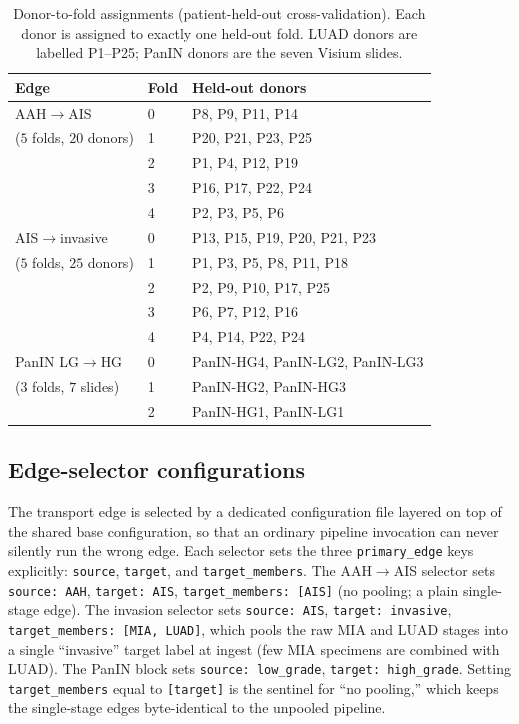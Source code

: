 \begin{table}[htbp]
  \centering
  \caption[Patient-fold assignments]{Donor-to-fold assignments (patient-held-out cross-validation).
  Each donor is assigned to exactly one held-out fold. LUAD donors are labelled P1--P25; PanIN
  donors are the seven Visium slides.}
  \label{tab:app-c-folds}
  \footnotesize
  \begin{tabular}{@{}llp{}@{}}
    \toprule
    Edge & Fold & Held-out donors \\
    \midrule
    AAH$\rightarrow$AIS      & 0 & P8, P9, P11, P14 \\
    ($5$ folds, $20$ donors) & 1 & P20, P21, P23, P25 \\
                             & 2 & P1, P4, P12, P19 \\
                             & 3 & P16, P17, P22, P24 \\
                             & 4 & P2, P3, P5, P6 \\
    \midrule
    AIS$\rightarrow$invasive & 0 & P13, P15, P19, P20, P21, P23 \\
    ($5$ folds, $25$ donors) & 1 & P1, P3, P5, P8, P11, P18 \\
                             & 2 & P2, P9, P10, P17, P25 \\
                             & 3 & P6, P7, P12, P16 \\
                             & 4 & P4, P14, P22, P24 \\
    \midrule
    PanIN LG$\rightarrow$HG  & 0 & PanIN-HG4, PanIN-LG2, PanIN-LG3 \\
    ($3$ folds, $7$ slides)  & 1 & PanIN-HG2, PanIN-HG3 \\
                             & 2 & PanIN-HG1, PanIN-LG1 \\
    \bottomrule
  \end{tabular}
\end{table}

\subsection{Edge-selector configurations}\label{sec:app-c-edges}

The transport edge is selected by a dedicated configuration file layered on top of the shared base
configuration, so that an ordinary pipeline invocation can never silently run the wrong edge. Each
selector sets the three \texttt{primary\_edge} keys explicitly: \texttt{source}, \texttt{target}, and
\texttt{target\_members}. The AAH$\rightarrow$AIS selector sets \texttt{source: AAH},
\texttt{target: AIS}, \texttt{target\_members: [AIS]} (no pooling; a plain single-stage edge). The
invasion selector sets \texttt{source: AIS}, \texttt{target: invasive},
\texttt{target\_members: [MIA, LUAD]}, which pools the raw MIA and LUAD stages into a single
``invasive'' target label at ingest (few MIA specimens are combined with LUAD). The PanIN block sets
\texttt{source: low\_grade}, \texttt{target: high\_grade}. Setting \texttt{target\_members} equal to
\texttt{[target]} is the sentinel for ``no pooling,'' which keeps the single-stage edges byte-identical
to the unpooled pipeline.


